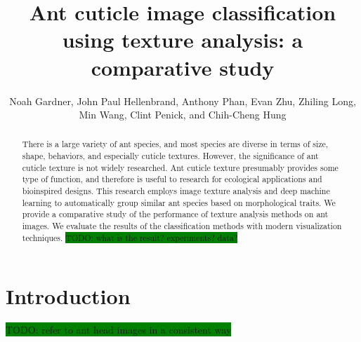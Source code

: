 \documentclass{aci}
\numberwithin{equation}{section}
\begin{document}
\title{Ant cuticle image classification using texture analysis: a comparative study}

\author{%
    Noah Gardner,
    John Paul Hellenbrand,
    Anthony Phan,
    Evan Zhu,
    Zhiling Long,
    Min Wang,
    Clint Penick,
    and Chih-Cheng Hung\corrauth
}%


\address{%
}


\begin{abstract}
    There is a large variety of ant species, and most species are diverse in
    terms of size, shape, behaviors, and especially cuticle textures. However,
    the significance of ant cuticle texture is not widely researched. Ant
    cuticle texture presumably provides some type of function, and therefore is
    useful to research for ecological applications and bioinspired designs. This
    research employs image texture analysis and deep machine learning to
    automatically group similar ant species based on morphological traits. We
    provide a comparative study of the performance of texture analysis methods
    on ant images. We evaluate the results of the classification methods with
    modern visualization techniques.
    \colorbox{green}{TODO: what is the result? experiments? data?}
\end{abstract}
\maketitle

\section{Introduction}
\colorbox{green}{TODO: refer to ant head images in a consistent way}
\end{document}
